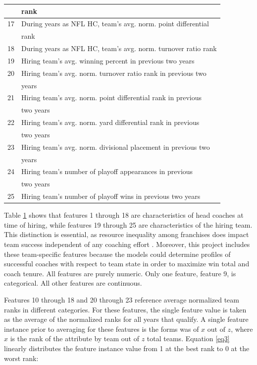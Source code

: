 \documentclass[conference]{IEEEtran}
\begin{document}
\begin{table}[htbp]
\begin{center}
\begin{tabular}{|c||l|}
&rank \\
\hline
17 & During years as NFL HC, team’s avg. norm. point differential \\
&rank \\
\hline
18 & During years as NFL HC, team’s avg. norm. turnover ratio rank \\
\hline
19 & Hiring team’s avg. winning percent in previous two years \\
\hline
20 & Hiring team’s avg. norm. turnover ratio rank in previous two \\
&years \\
\hline
21 & Hiring team’s avg. norm. point differential rank in previous\\
& two years \\
\hline
22 & Hiring team’s avg. norm. yard differential rank in previous\\
&two years \\
\hline
23 & Hiring team’s avg. norm. divisional placement in previous two\\
&years \\
\hline
24 & Hiring team’s number of playoff appearances in previous\\
&two years \\
\hline
25 & Hiring team’s number of playoff wins in previous two years \\
\hline
\end{tabular}
\label{tab1}
\end{center}
\end{table}

Table \ref{tab1} shows that features 1 through 18 are characteristics of head coaches at time of hiring, while features 19 through 25 are characteristics of the hiring team. This distinction is essential, as resource inequality among franchises does impact team success independent of any coaching effort \cite{b6}. Moreover, this project includes these team-specific features because the models could determine profiles of successful coaches with respect to team state in order to maximize win total and coach tenure. All features are purely numeric. Only one feature, feature 9, is categorical. All other features are continuous.

Features 10 through 18 and 20 through 23 reference average normalized team ranks in different categories. For these features, the single feature value is taken as the average of the normalized ranks for all years that qualify. A single feature instance prior to averaging for these features is the forms was of $x \text{ out of }z$, where $x$ is the rank of the attribute by team out of $z$ total teams. Equation \eqref{eq3} linearly distributes the feature instance value from 1 at the best rank to 0 at the worst rank:
\end{document}
